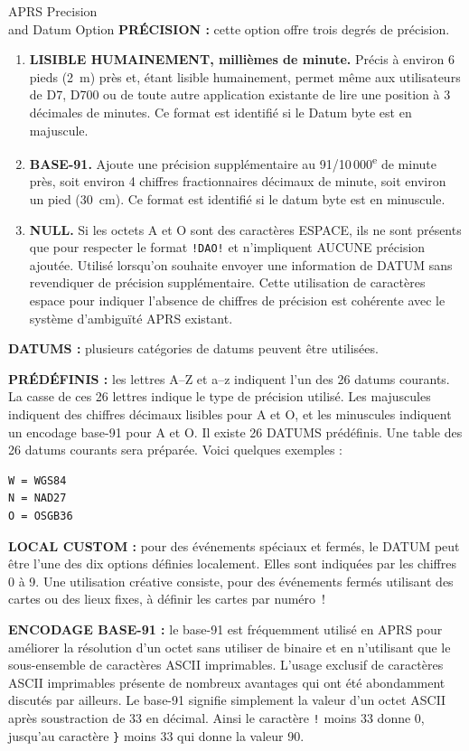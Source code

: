 \begin{aprssideblock}{APRS Precision\\and Datum Option}
\textbf{PRÉCISION :} cette option offre trois degrés de précision.

\begin{enumerate}
\item \textbf{LISIBLE HUMAINEMENT, millièmes de minute.} Précis à environ
  6 pieds (2~m) près et, étant lisible humainement, permet même aux
  utilisateurs de D7, D700 ou de toute autre application existante de lire
  une position à 3 décimales de minutes. Ce format est identifié si le Datum
  byte est en majuscule.

\item \textbf{BASE-91.} Ajoute une précision supplémentaire au
  91/10\,000\textsuperscript{e} de minute près, soit environ 4 chiffres
  fractionnaires décimaux de minute, soit environ un pied (30~cm). Ce format
  est identifié si le datum byte est en minuscule.

\item \textbf{NULL.} Si les octets A et O sont des caractères ESPACE, ils ne
  sont présents que pour respecter le format \texttt{!DAO!} et n'impliquent
  AUCUNE précision ajoutée. Utilisé lorsqu'on souhaite envoyer une
  information de DATUM sans revendiquer de précision supplémentaire. Cette
  utilisation de caractères espace pour indiquer l'absence de chiffres de
  précision est cohérente avec le système d'ambiguïté APRS existant.
\end{enumerate}

\textbf{DATUMS :} plusieurs catégories de datums peuvent être utilisées.

\textbf{PRÉDÉFINIS :} les lettres A--Z et a--z indiquent l'un des 26 datums
courants. La casse de ces 26 lettres indique le type de précision utilisé.
Les majuscules indiquent des chiffres décimaux lisibles pour A et O, et les
minuscules indiquent un encodage base-91 pour A et O. Il existe 26 DATUMS
prédéfinis. Une table des 26 datums courants sera préparée. Voici quelques
exemples :

\begin{verbatim}
W = WGS84
N = NAD27
O = OSGB36
\end{verbatim}

\textbf{LOCAL CUSTOM :} pour des événements spéciaux et fermés, le DATUM
peut être l'une des dix options définies localement. Elles sont indiquées par
les chiffres 0 à 9. Une utilisation créative consiste, pour des événements
fermés utilisant des cartes ou des lieux fixes, à définir les cartes par
numéro~!

\textbf{ENCODAGE BASE-91 :} le base-91 est fréquemment utilisé en APRS pour
améliorer la résolution d'un octet sans utiliser de binaire et en
n'utilisant que le sous-ensemble de caractères ASCII imprimables. L'usage
exclusif de caractères ASCII imprimables présente de nombreux avantages qui
ont été abondamment discutés par ailleurs. Le base-91 signifie simplement la
valeur d'un octet ASCII après soustraction de 33 en décimal. Ainsi le
caractère \guillemotleft{}\texttt{!}\guillemotright{} moins 33 donne
\guillemotleft{}0\guillemotright{}, jusqu'au caractère
\guillemotleft{}\texttt{\}}\guillemotright{} moins 33 qui donne la valeur
\guillemotleft{}90\guillemotright{}.


\end{aprssideblock}
